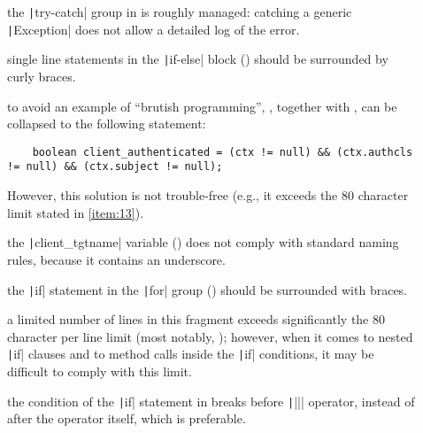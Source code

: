 
\begin{description}
	
	\item []
		the \texttt|try-catch| group in  is roughly managed: catching a generic \texttt|Exception| does not allow a detailed log of the error.

\end{description}



\begin{description}

	\item [] 
		single line statements in the \texttt|if-else| block () should be surrounded by curly braces.
	
	\item []
		to avoid an example of ``brutish programming'', , together with , can be collapsed to the following statement: 
		
		\begin{verbatim}
	boolean client_authenticated = (ctx != null) && (ctx.authcls != null) && (ctx.subject != null);
		\end{verbatim}
		
		However, this solution is not trouble-free (e.g., it exceeds the 80 character limit stated in \cref{item:13}).
		
\end{description}


\begin{description}
	
	\item []
		the \texttt|client_tgtname| variable () does not comply with standard naming rules, because it contains an underscore.
	
	\item [] 
		the \texttt|if| statement in the \texttt|for| group () should be surrounded with braces.
	
	\item []
		a limited number of lines in this fragment exceeds significantly the 80 character per line limit (most notably, ); however, when it comes to nested \texttt|if| clauses and to method calls inside the \texttt|if| conditions, it may be difficult to comply with this limit.
	
	\item []
		the condition of the \texttt|if| statement in  breaks before \texttt|||| operator, instead of after the operator itself, which is preferable.
	
\end{description}



